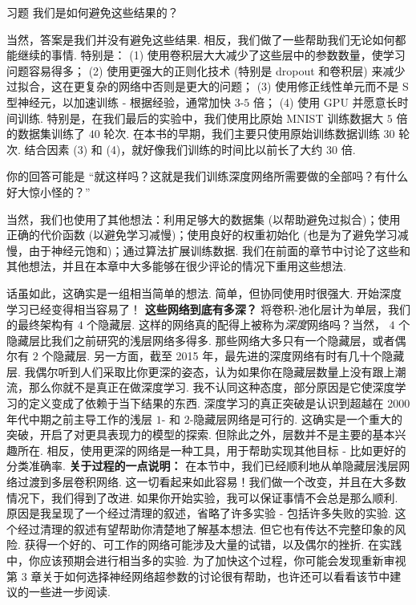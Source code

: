 \begin{exerciseBox}{习题}
我们是如何避免这些结果的？

当然，答案是我们并没有避免这些结果. 相反，我们做了一些帮助我们无论如何都能继续的事情. 特别是： (1) 使用卷积层大大减少了这些层中的参数数量，使学习问题容易得多； (2) 使用更强大的正则化技术 (特别是 dropout 和卷积层) 来减少过拟合，这在更复杂的网络中否则是更大的问题； (3) 使用修正线性单元而不是 S 型神经元，以加速训练 - 根据经验，通常加快 $3$-$5$ 倍； (4) 使用 GPU 并愿意长时间训练. 特别是，在我们最后的实验中，我们使用比原始 MNIST 训练数据大 $5$ 倍的数据集训练了 $40$ 轮次. 在本书的早期，我们主要只使用原始训练数据训练 $30$ 轮次. 结合因素 (3) 和 (4)，就好像我们训练的时间比以前长了大约 $30$ 倍.

你的回答可能是 ``就这样吗？这就是我们训练深度网络所需要做的全部吗？有什么好大惊小怪的？''

当然，我们也使用了其他想法：利用足够大的数据集 (以帮助避免过拟合)；使用正确的代价函数 (以避免学习减慢)；使用良好的权重初始化 (也是为了避免学习减慢，由于神经元饱和)；通过算法扩展训练数据. 我们在前面的章节中讨论了这些和其他想法，并且在本章中大多能够在很少评论的情况下重用这些想法.

话虽如此，这确实是一组相当简单的想法. 简单，但协同使用时很强大. 开始深度学习已经变得相当容易了！ \textbf{这些网络到底有多深？} 将卷积-池化层计为单层，我们的最终架构有 $4$ 个隐藏层. 这样的网络真的配得上被称为\emph{深度}网络吗？当然， $4$ 个隐藏层比我们之前研究的浅层网络多得多. 那些网络大多只有一个隐藏层，或者偶尔有 $2$ 个隐藏层. 另一方面，截至 2015 年，最先进的深度网络有时有几十个隐藏层. 我偶尔听到人们采取比你更深的姿态，认为如果你在隐藏层数量上没有跟上潮流，那么你就不是真正在做深度学习. 我不认同这种态度，部分原因是它使深度学习的定义变成了依赖于当下结果的东西. 深度学习的真正突破是认识到超越在 2000 年代中期之前主导工作的浅层 $1$- 和 $2$-隐藏层网络是可行的. 这确实是一个重大的突破，开启了对更具表现力的模型的探索. 但除此之外，层数并不是主要的基本兴趣所在. 相反，使用更深的网络是一种工具，用于帮助实现其他目标 - 比如更好的分类准确率. \textbf{关于过程的一点说明：} 在本节中，我们已经顺利地从单隐藏层浅层网络过渡到多层卷积网络. 这一切看起来如此容易！我们做一个改变，并且在大多数情况下，我们得到了改进. 如果你开始实验，我可以保证事情不会总是那么顺利. 原因是我呈现了一个经过清理的叙述，省略了许多实验 - 包括许多失败的实验. 这个经过清理的叙述有望帮助你清楚地了解基本想法. 但它也有传达不完整印象的风险. 获得一个好的、可工作的网络可能涉及大量的试错，以及偶尔的挫折. 在实践中，你应该预期会进行相当多的实验. 为了加快这个过程，你可能会发现重新审视第 3 章关于如何选择神经网络超参数的讨论很有帮助，也许还可以看看该节中建议的一些进一步阅读.

\end{exerciseBox}

